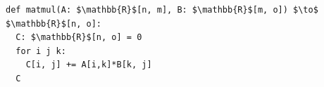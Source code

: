 \documentclass[border=10pt]{standalone}
\begin{document}
\begin{lstlisting}
def matmul(A: $\mathbb{R}$[n, m], B: $\mathbb{R}$[m, o]) $\to$ $\mathbb{R}$[n, o]:
  C: $\mathbb{R}$[n, o] = 0
  for i j k:
    C[i, j] += A[i,k]*B[k, j]
  C
\end{lstlisting}
\end{document}
